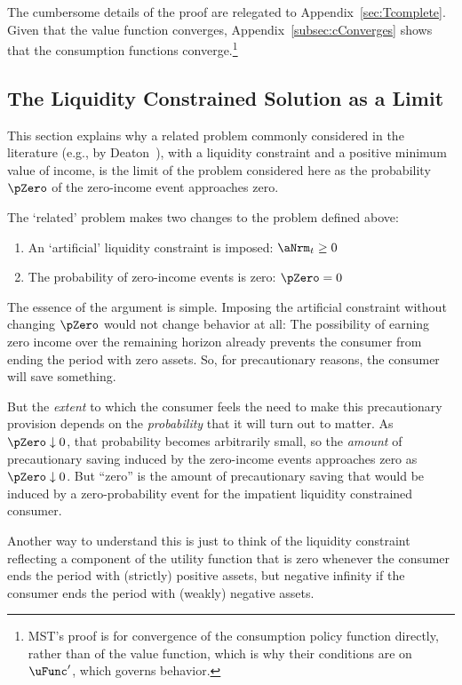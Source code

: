 \documentclass[BufferStockTheory]{subfiles}
\begin{document}
The cumbersome details of the proof are relegated to Appendix~\ref{sec:Tcomplete}.  Given that the value function converges, Appendix~\ref{subsec:cConverges} shows that the consumption functions converge.\footnote{MST's proof is for convergence of the consumption policy function directly, rather than of the value function, which is why their conditions are on $\uFunc^{\prime}$, which governs behavior.}

\hypertarget{The-Liquidity-Constrained-Solution-as-a-Limit}{}
\subsection{The Liquidity Constrained Solution as a Limit}\label{sec:deatonIsLimit}

This section explains why a related problem commonly considered in the literature (e.g., by Deaton~\citeyearpar{deatonLiqConstr}), with a liquidity constraint and a positive minimum value of income, is the limit of the problem considered here as the probability $\pZero$ of the zero-income event approaches zero.

The `related' problem makes two changes to the problem defined above:
\begin{enumerate}
\item An `artificial' liquidity constraint is imposed: $\aNrm_{t}\geq 0$
\item The probability of zero-income events is zero: $\pZero=0$
\end{enumerate}

The essence of the argument is simple.  Imposing the artificial constraint without changing $\pZero$ would not change behavior at all: The possibility of earning zero income over the remaining horizon already prevents the consumer from ending the period with zero assets.  So, for precautionary reasons, the consumer will save something.

But the \textit{extent} to which the consumer feels the need to make this precautionary provision depends on the \textit{probability} that it will turn out to matter.  As $\pZero \downarrow 0$, that probability becomes arbitrarily small, so the \textit{amount} of precautionary saving induced by the zero-income events approaches zero as $\pZero \downarrow 0$.  But ``zero'' is the amount of precautionary saving that would be induced by a zero-probability event for the impatient liquidity constrained consumer.

Another way to understand this is just to think of the liquidity constraint reflecting a component of the utility function that is zero whenever the consumer ends the period with (strictly) positive assets, but negative infinity if the consumer ends the period with (weakly) negative assets.
\end{document}

